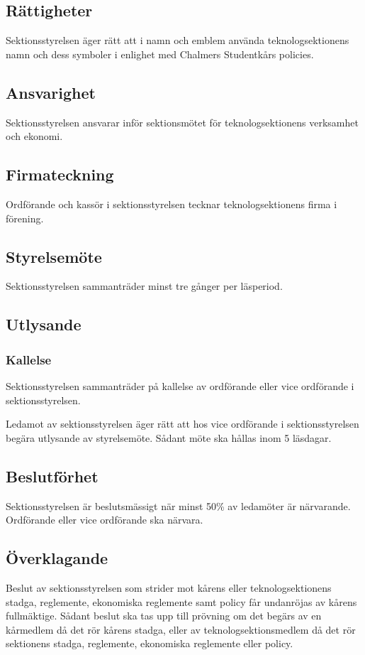 \documentclass[a4paper]{dtek}
\begin{document}
\subsection{Rättigheter}
Sektionsstyrelsen äger rätt att i namn och emblem använda teknologsektionens namn och dess symboler i enlighet med Chalmers Studentkårs policies.
\subsection{Ansvarighet}
Sektionsstyrelsen ansvarar inför sektionsmötet för teknologsektionens verksamhet och ekonomi.
\subsection{Firmateckning}
Ordförande och kassör i sektionsstyrelsen tecknar teknologsektionens firma i förening.
\subsection{Styrelsemöte}
Sektionsstyrelsen sammanträder minst tre gånger per läsperiod.
\subsection{Utlysande}
\subsubsection{Kallelse}
Sektionsstyrelsen sammanträder på kallelse av ordförande eller vice ordförande i sektionsstyrelsen.

Ledamot av sektionsstyrelsen äger rätt att hos vice ordförande i sektionsstyrelsen begära utlysande av styrelsemöte.
Sådant möte ska hållas inom 5 läsdagar.
\subsection{Beslutförhet}
Sektionsstyrelsen är beslutsmässigt när minst 50\% av ledamöter är närvarande. Ordförande eller vice ordförande ska närvara.
\subsection{Överklagande}
Beslut av sektionsstyrelsen som strider mot kårens eller teknologsektionens stadga, reglemente, ekonomiska reglemente samt policy får undanröjas av kårens fullmäktige. Sådant beslut ska tas upp till prövning om det begärs av en kårmedlem då det rör kårens stadga, eller av teknologsektionsmedlem då det rör sektionens stadga, reglemente, ekonomiska reglemente eller policy.
\end{document}
